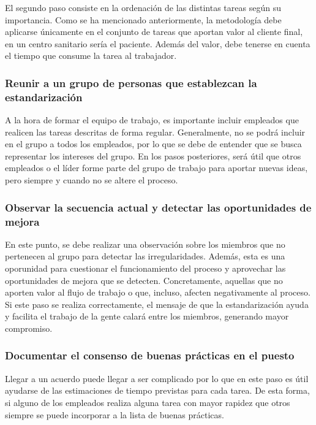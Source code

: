 El segundo paso consiste en la ordenación de las distintas tareas según su importancia.
Como se ha mencionado anteriormente, la metodología debe aplicarse únicamente en el conjunto de tareas que aportan valor al cliente final, en un centro sanitario sería el paciente.
Además del valor, debe tenerse en cuenta el tiempo que consume la tarea al trabajador.

\subsubsection{Reunir a un grupo de personas que establezcan la estandarización}

A la hora de formar el equipo de trabajo, es importante incluir empleados que realicen las tareas descritas de forma regular.
Generalmente, no se podrá incluir en el grupo a todos los empleados, por lo que se debe de entender que se busca representar los intereses del grupo.
En los pasos posteriores, será útil que otros empleados o el líder forme parte del grupo de trabajo para aportar nuevas ideas, pero siempre y cuando no se altere el proceso.

\subsubsection{Observar la secuencia actual y detectar las oportunidades de mejora}

En este punto, se debe realizar una observación sobre los miembros que no pertenecen al grupo para detectar las irregularidades.
Además, esta es una oporunidad para cuestionar el funcionamiento del proceso y aprovechar las oportunidades de mejora que se detecten.
Concretamente, aquellas que no aporten valor al flujo de trabajo o que, incluso, afecten negativamente al proceso.
Si este paso se realiza correctamente, el mensaje de que la estandarización ayuda y facilita el trabajo de la gente calará entre los miembros, generando mayor compromiso.

\subsubsection{Documentar el consenso de buenas prácticas en el puesto}

Llegar a un acuerdo puede llegar a ser complicado por lo que en este paso es útil ayudarse de las estimaciones de tiempo previstas para cada tarea.
De esta forma, si alguno de los empleados realiza alguna tarea con mayor rapidez que otros siempre se puede incorporar a la lista de buenas prácticas.

